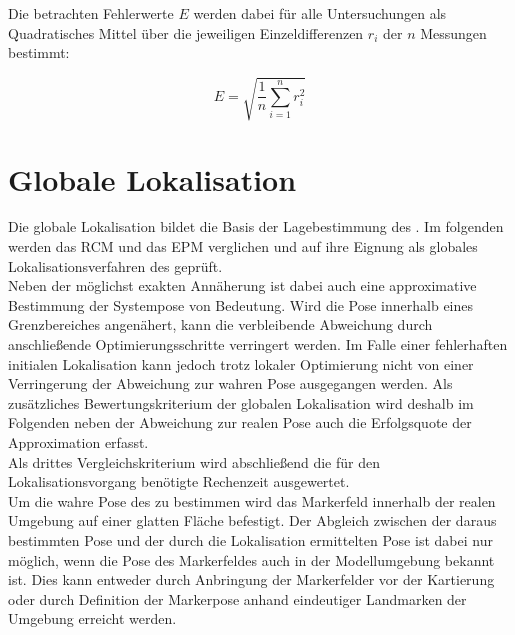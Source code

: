 Die betrachten Fehlerwerte $E$ werden dabei für alle Untersuchungen als Quadratisches Mittel über die jeweiligen Einzeldifferenzen $r_i$ der $n$ Messungen bestimmt:

\begin{equation}
E = \sqrt{\frac{1}{n}\sum_{i=1}^nr_i^2}
\end{equation}


\section{Globale Lokalisation}
Die globale Lokalisation bildet die Basis der Lagebestimmung des . Im folgenden werden das RCM und das EPM verglichen und auf ihre Eignung als globales Lokalisationsverfahren des  geprüft.\\
Neben der möglichst exakten Annäherung ist dabei auch eine approximative Bestimmung der Systempose von Bedeutung. Wird die Pose innerhalb eines Grenzbereiches angenähert, kann die verbleibende Abweichung durch anschließende Optimierungsschritte verringert werden. Im Falle einer fehlerhaften initialen Lokalisation kann jedoch trotz lokaler Optimierung nicht von einer Verringerung der Abweichung zur wahren Pose ausgegangen werden. Als zusätzliches Bewertungskriterium der globalen Lokalisation wird deshalb im Folgenden neben der Abweichung zur realen Pose auch die Erfolgsquote der Approximation erfasst.\\
Als drittes Vergleichskriterium wird abschließend die für den Lokalisationsvorgang benötigte Rechenzeit ausgewertet.\\


Um die wahre Pose des  zu bestimmen wird das Markerfeld innerhalb der realen Umgebung auf einer glatten Fläche befestigt. Der Abgleich zwischen der daraus bestimmten Pose und der durch die Lokalisation ermittelten Pose ist dabei nur möglich, wenn die Pose des Markerfeldes auch in der Modellumgebung bekannt ist. Dies kann entweder durch Anbringung der Markerfelder vor der Kartierung oder durch Definition der Markerpose anhand eindeutiger Landmarken der Umgebung erreicht werden.\\

